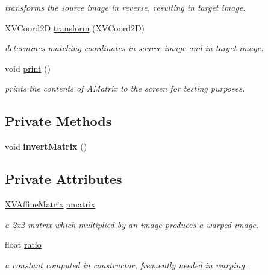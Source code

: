 \begin{CompactItemize}
\begin{CompactList}\small\item\em transforms the source image in reverse, resulting in target image.\item\end{CompactList}\item 
\label{XVAffineWarp_a9}
\hypertarget{class_XVAffineWarp_a9}{
XVCoord2D \hyperlink{class_XVAffineWarp_a9}{transform} (XVCoord2D)}

\begin{CompactList}\small\item\em determines matching coordinates in source image and in target image.\item\end{CompactList}\item 
\label{XVAffineWarp_a10}
\hypertarget{class_XVAffineWarp_a10}{
void \hyperlink{class_XVAffineWarp_a10}{print} ()}

\begin{CompactList}\small\item\em prints the contents of AMatrix to the screen for testing purposes.\item\end{CompactList}\end{CompactItemize}
\subsection*{Private Methods}
\begin{CompactItemize}
\item 
\label{XVAffineWarp_c0}
\hypertarget{class_XVAffineWarp_c0}{
void {\bf invert\-Matrix} ()}

\end{CompactItemize}
\subsection*{Private Attributes}
\begin{CompactItemize}
\item 
\hyperlink{class_XVAffineMatrix}{XVAffine\-Matrix} \hyperlink{class_XVAffineWarp_o0}{amatrix}
\begin{CompactList}\small\item\em a 2x2 matrix which multiplied by an image produces a warped image.\item\end{CompactList}\item 
float \hyperlink{class_XVAffineWarp_o1}{ratio}
\begin{CompactList}\small\item\em a constant computed in constructor, frequently needed in warping.\item\end{CompactList}\end{CompactItemize}


